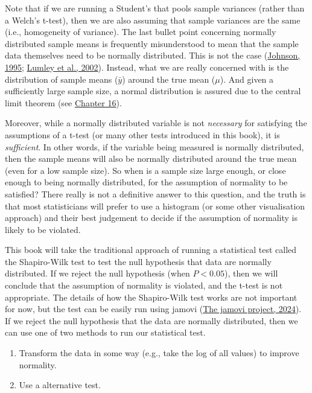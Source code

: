 \documentclass[
  openany]{krantz}
\providecommand{\tightlist}{%
  \setlength{\itemsep}{0pt}\setlength{\parskip}{0pt}}
\begin{document}
Note that if we are running a Student's  that pools sample variances (rather than a Welch's t-test), then we are also assuming that sample variances are the same (i.e., homogeneity of variance).
The last bullet point concerning normally distributed sample means is frequently misunderstood to mean that the sample data themselves need to be normally distributed.
This is not the case (\protect\hyperlink{ref-Johnson1995}{Johnson, 1995}; \protect\hyperlink{ref-Lumley2002}{Lumley et al., 2002}).
Instead, what we are really concerned with is the distribution of sample means (\(\bar{y}\)) around the true mean (\(\mu\)).
And given a sufficiently large sample size, a normal distribution is assured due to the central limit theorem (see \protect\hyperlink{Chapter_16}{Chapter 16}).

Moreover, while a normally distributed variable is not \emph{necessary} for satisfying the assumptions of a t-test (or many other tests introduced in this book), it is \emph{sufficient}.
In other words, if the variable being measured is normally distributed, then the sample means will also be normally distributed around the true mean (even for a low sample size).
So when is a sample size large enough, or close enough to being normally distributed, for the assumption of normality to be satisfied?
There really is not a definitive answer to this question, and the truth is that most statisticians will prefer to use a histogram (or some other visualisation approach) and their best judgement to decide if the assumption of normality is likely to be violated.

This book will take the traditional approach of running a statistical test called the Shapiro-Wilk test to test the null hypothesis that data are normally distributed.
If we reject the null hypothesis (when \(P < 0.05\)), then we will conclude that the assumption of normality is violated, and the t-test is not appropriate.
The details of how the Shapiro-Wilk test works are not important for now, but the test can be easily run using jamovi (\protect\hyperlink{ref-Jamovi2022}{The jamovi project, 2024}).
If we reject the null hypothesis that the data are normally distributed, then we can use one of two methods to run our statistical test.

\begin{enumerate}
\def\labelenumi{\arabic{enumi}.}
\tightlist
\item
  Transform the data in some way (e.g., take the log of all values) to improve normality.
\item
  Use a  alternative test.
\end{enumerate}
\end{document}
